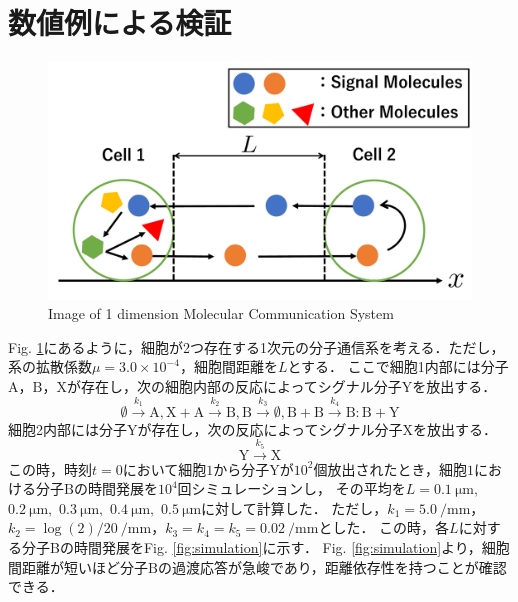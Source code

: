 \documentclass[twocolumn]{jarticle}
\begin{document}

\section{数値例による検証}
\begin{figure}[tb]
    \centering
    \includegraphics[width=\columnwidth] {figures/Images.pdf}
    \caption{Image of 1 dimension Molecular Communication System}
    \label{fig:image}
\end{figure}
Fig. \ref{fig:image}にあるように，細胞が2つ存在する1次元の分子通信系を考える．ただし，系の拡散係数$\mu=$$3.0\times10^{-4}$，細胞間距離を$L$とする．
ここで細胞1内部には分子$\mathrm{A}$，$\mathrm{B}$，$\mathrm{X}$が存在し，次の細胞内部の反応によってシグナル分子$\mathrm{Y}$を放出する．
\begin{equation}
    \emptyset \xrightarrow{k_1} \mathrm{A},\mathrm{X}+\mathrm{A} \xrightarrow{k_2} \mathrm{B}, \mathrm{B} \xrightarrow{k_3} \emptyset, \mathrm{B}+\mathrm{B}\xrightarrow{k_4} \mathrm{B:B} +\mathrm{Y}
\end{equation}
細胞2内部には分子$\mathrm{Y}$が存在し，次の反応によってシグナル分子$\mathrm{X}$を放出する．
\begin{equation}
    \mathrm{Y} \xrightarrow{k_5} \mathrm{X}
\end{equation}
この時，時刻$t=0$において細胞$1$から分子$\mathrm{Y}$が$10^2$個放出されたとき，細胞$1$における分子$\mathrm{B}$の時間発展を$10^4$回シミュレーションし，
その平均を$L=\SI{0.1}{\um},$ $\SI{0.2}{\um},$ $\SI{0.3}{\um},$ $\SI{0.4}{\um},$ $\SI{0.5}{\um}$に対して計算した．
ただし，$k_1 = \SI{5.0}{\per\mm}$，$k_2 = \log(2)/20\ \si{\per\mm}$，$k_3=k_4=k_5=\SI{0.02}{\per\mm}$とした．
この時，各$L$に対する分子Bの時間発展をFig. \ref{fig:simulation}に示す．
Fig. \ref{fig:simulation}より，細胞間距離が短いほど分子$\mathrm{B}$の過渡応答が急峻であり，距離依存性を持つことが確認できる．
\end{document}
